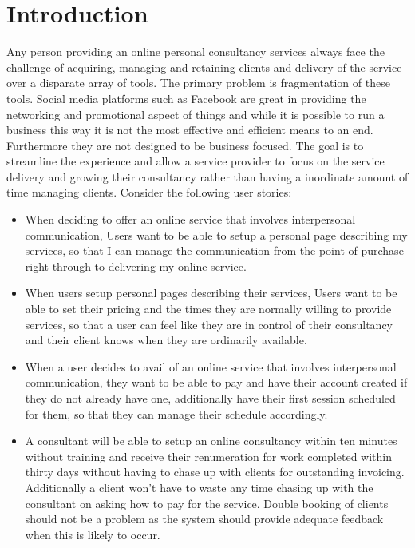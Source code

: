 \chapter{Introduction}
Any person providing an online personal consultancy services always face the challenge of acquiring, managing and retaining clients and delivery of the service over a disparate array of tools.  The primary problem is fragmentation of these tools.  Social media platforms such as Facebook are great in providing the networking and promotional aspect of things and while it is possible to run a business this way it is not the most effective and efficient means to an end.  Furthermore they are not designed to be business focused.
The goal is to streamline the experience and allow a service provider to focus on the service delivery and growing their consultancy rather than having a inordinate amount of time managing clients. Consider the following user stories:
\begin{itemize}
\item When deciding to offer an online service that involves interpersonal communication, Users want to be able to setup a personal page describing my services, so that I can manage the communication from the point of purchase right through to delivering my online service.
\item When users setup personal pages describing their services, Users want to be able to set their pricing and the times they are normally willing to provide services, so that a user can feel like they are in control of their consultancy and their client knows when they are ordinarily available.
\item When a user decides to avail of an online service that involves interpersonal communication, they want to be able to pay and have their account created if they do not already have one, additionally have their first session scheduled for them, so that they can manage their schedule accordingly.
\item A consultant will be able to setup an online consultancy within ten minutes without training and receive their renumeration for work completed within thirty days without having to chase up with clients for outstanding invoicing.  Additionally a client won’t have to waste any time chasing up with the consultant on asking how to pay for the service.  Double booking of clients should not be a problem as the system should provide adequate feedback when this is likely to occur. 
\end{itemize}